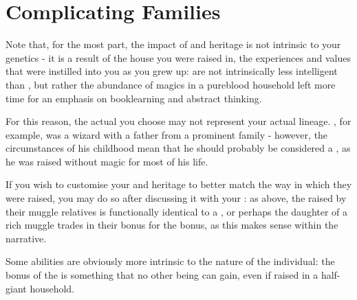 	


\section{Complicating Families}

Note that, for the most part, the impact of  and heritage is not intrinsic to your genetics - it is a result of the house you were raised in, the experiences and values that were instilled into you as you grew up:  are not intrinsically less intelligent than , but rather the abundance of magics in a pureblood household left more time for an emphasis on booklearning and abstract thinking. 

For this reason, the actual  you choose may not represent your actual lineage. , for example, was a  wizard with a father from a prominent  family - however, the circumstances of his childhood mean that he should probably be considered a , as he was raised without magic for most of his life.  
 
 If you wish to customise your  and heritage to better match the way in which they were raised, you may do so after discussing it with your : as above, the  raised by their muggle relatives is functionally identical to a , or perhaps the  daughter of a rich muggle trades in their  bonus for the  bonus, as this makes sense within the narrative. 
 
 Some abilities are obviously more intrinsic to the nature of the individual: the  bonus of the  is something that no other being can gain, even if raised in a half-giant household. 
